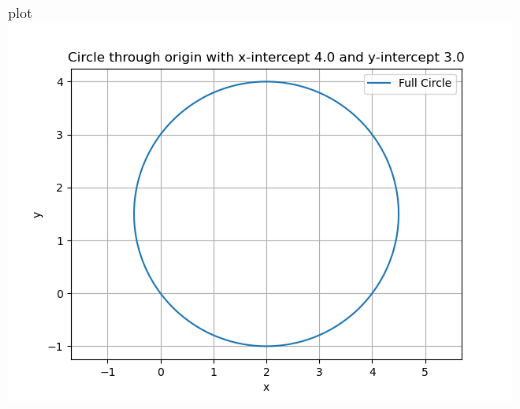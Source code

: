 \documentclass{beamer}
\begin{document}
\begin{frame}{plot}
\centering
    \includegraphics[width=\columnwidth, height=0.8\textheight, keepaspectratio]{../figs/fig.png}     
\end{frame}
\end{document}
